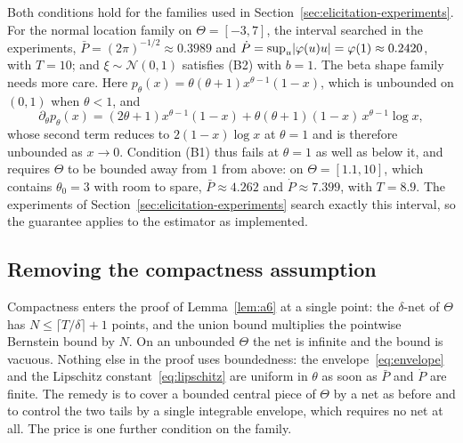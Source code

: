 Both conditions hold for the families used in Section~\ref{sec:elicitation-experiments}. For the normal location family on $\Theta=[-3,7]$, the interval searched in the experiments, $\bar P=(2\pi)^{-1/2}\approx0.3989$ and $\dot P=\sup_{u}\lvert\varphi(u)u\rvert=\varphi(1)\approx0.2420$, with $T=10$; and $\xi\sim\mathcal{N}(0,1)$ satisfies (B2) with $b=1$. The beta shape family needs more care. Here $p_{\theta}(x)=\theta(\theta+1)x^{\theta-1}(1-x)$, which is unbounded on $(0,1)$ when $\theta<1$, and
$$
\partial_{\theta}p_{\theta}(x)=(2\theta+1)x^{\theta-1}(1-x)+\theta(\theta+1)(1-x)\,x^{\theta-1}\log x ,
$$
whose second term reduces to $2(1-x)\log x$ at $\theta=1$ and is therefore unbounded as $x\to0$. Condition (B1) thus fails at $\theta=1$ as well as below it, and requires $\Theta$ to be bounded away from $1$ from above: on $\Theta=[1.1,10]$, which contains $\theta_{0}=3$ with room to spare, $\bar P\approx4.262$ and $\dot P\approx7.399$, with $T=8.9$. The experiments of Section~\ref{sec:elicitation-experiments} search exactly this interval, so the guarantee applies to the estimator as implemented.


\subsection*{Removing the compactness assumption}

Compactness enters the proof of Lemma~\ref{lem:a6} at a single point: the $\delta$-net of $\Theta$ has $N\le\lceil T/\delta\rceil+1$ points, and the union bound multiplies the pointwise Bernstein bound by $N$. On an unbounded $\Theta$ the net is infinite and the bound is vacuous. Nothing else in the proof uses boundedness: the envelope~\eqref{eq:envelope} and the Lipschitz constant~\eqref{eq:lipschitz} are uniform in $\theta$ as soon as $\bar P$ and $\dot P$ are finite. The remedy is to cover a bounded central piece of $\Theta$ by a net as before and to control the two tails by a single integrable envelope, which requires no net at all. The price is one further condition on the family.


